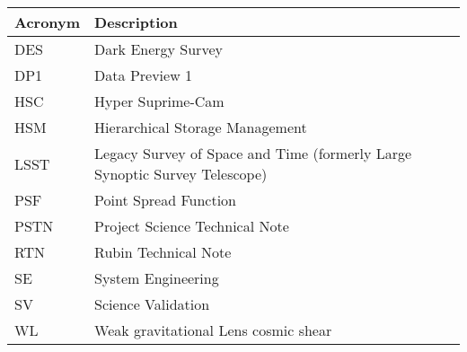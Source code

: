 \addtocounter{table}{-1}
\begin{longtable}{p{}p{}}\hline
\textbf{Acronym} & \textbf{Description}  \\\hline

DES & Dark Energy Survey \\\hline
DP1 & Data Preview 1 \\\hline
HSC & Hyper Suprime-Cam \\\hline
HSM & Hierarchical Storage Management \\\hline
LSST & Legacy Survey of Space and Time (formerly Large Synoptic Survey Telescope) \\\hline
PSF & Point Spread Function \\\hline
PSTN & Project Science Technical Note \\\hline
RTN & Rubin Technical Note \\\hline
SE & System Engineering \\\hline
SV & Science Validation \\\hline
WL & Weak gravitational Lens cosmic shear \\\hline
\end{longtable}
